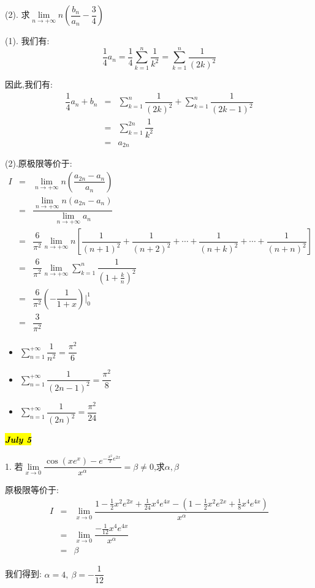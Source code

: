 (2). 求$\lim\limits_{n\rightarrow+\infty}n\left( \dfrac{b_{n}}{a_{n}}-\dfrac{3}{4}\right) $
\begin{solution}
	
	(1). 我们有: $$\dfrac{1}{4}a_{n}=\dfrac{1}{4}\sum\limits_{k=1}^{n}\dfrac{1}{k^2}=\sum\limits_{k=1}^{n}\dfrac{1}{(2k)^2}$$
	
	因此,我们有: 
	\begin{eqnarray*}
		\dfrac{1}{4}a_{n}+b_{n}&=&\sum\limits_{k=1}^{n}\dfrac{1}{(2k)^2}+\sum\limits_{k=1}^{n}\dfrac{1}{(2k-1)^2}\\
		&=&\sum\limits_{k=1}^{2n}\dfrac{1}{k^2}\\
		&=&a_{2n}
	\end{eqnarray*}
	
	(2).原极限等价于: 
	\begin{eqnarray*}
		I&=&\lim\limits_{n\rightarrow+\infty}n\left( \dfrac{a_{2n}-a_{n}}{a_{n}}\right)\\
		&=&\dfrac{\lim\limits_{n\rightarrow+\infty}n(a_{2n}-a_{n})}{\lim\limits_{n\rightarrow+\infty}a_{n}}\\
		&=&\dfrac{6}{\pi^2}\lim\limits_{n\rightarrow+\infty}n\left[ \dfrac{1}{(n+1)^2}+\dfrac{1}{(n+2)^2}+\cdots+\dfrac{1}{(n+k)^2}+\cdots+\dfrac{1}{(n+n)^2}\right]\\
		&=& \dfrac{6}{\pi^2}\lim\limits_{n\rightarrow+\infty}\sum\limits_{k=1}^{n}\dfrac{1}{(1+\frac{k}{n})^2}\\
		&=&\dfrac{6}{\pi^2}(-\dfrac{1}{1+x})|_{0}^{1}\\
		&=&\dfrac{3}{\pi^2}
	\end{eqnarray*}
\end{solution}
\begin{anymark}[注]
	\begin{itemize}
		\item $\sum\limits_{n=1}^{+\infty}\dfrac{1}{n^2}=\dfrac{\pi^2}{6}$
		\item $\sum\limits_{n=1}^{+\infty}\dfrac{1}{(2n-1)^2}=\dfrac{\pi^2}{8}$
		\item $\sum\limits_{n=1}^{+\infty}\dfrac{1}{(2n)^2}=\dfrac{\pi^2}{24}$
	\end{itemize}
\end{anymark}

\hl{\textbf{\textit{July 5}}}

1. 若$\lim\limits_{x\rightarrow 0}\dfrac{\cos(xe^x)-e^{-\frac{x^2}{2}e^{2x}}}{x^{\alpha}}=\beta\neq0$,求$\alpha,\beta$
\begin{solution}
	
	原极限等价于: 
	\begin{eqnarray*}
		I&=&\lim\limits_{x\rightarrow 0}\dfrac{1-\frac{1}{2}x^2e^{2x}+\frac{1}{24}x^4e^{4x}-(1-\frac{1}{2}x^2e^{2x}+\frac{1}{8}x^4e^{4x})}{x^{\alpha}}\\
		&=&\lim\limits_{x\rightarrow 0}\dfrac{-\frac{1}{12}x^4e^{4x}}{x^{\alpha}}\\
		&=&\beta
	\end{eqnarray*}
	
	我们得到: $\alpha=4,\ \beta=-\dfrac{1}{12}$
\end{solution}

